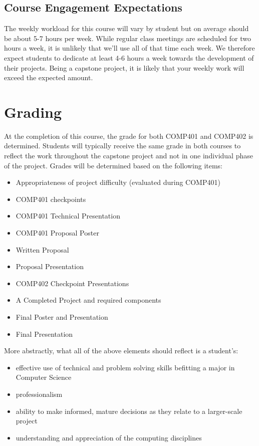 \documentclass[10pt]{article}
\begin{document}
\subsection{Course Engagement Expectations}

The weekly workload for this course will vary by student but on average should be about 5-7 hours per week.  While regular class meetings are scheduled for two hours a week, it is unlikely that we'll use all of that time each week.  We therefore expect students to dedicate at least 4-6 hours a week towards the development of their projects.  Being a capstone project, it is likely that your weekly work will exceed the expected amount.

\section{Grading}

At the completion of this course, the grade for both COMP401 and COMP402 is determined. Students will typically receive the same grade in both courses to reflect the work throughout the capstone project and not in one individual phase of the project. Grades will be determined based on the following items:
\begin{itemize}
\item Appropriateness of project difficulty (evaluated during COMP401) 
\item COMP401 checkpoints
\item COMP401 Technical Presentation
\item COMP401 Proposal Poster
\item Written Proposal
\item Proposal Presentation
\item COMP402 Checkpoint Presentations 
\item A Completed Project and required components
\item Final Poster and Presentation
\item Final Presentation 
\end{itemize}

More abstractly, what all of the above elements should reflect is a student's: 
\begin{itemize}
\item effective use of technical and problem solving skills befitting a major in Computer Science
\item professionalism
\item ability to make informed, mature decisions as they relate to a larger-scale project
\item understanding and appreciation of the computing disciplines
\end{itemize}
\end{document}
